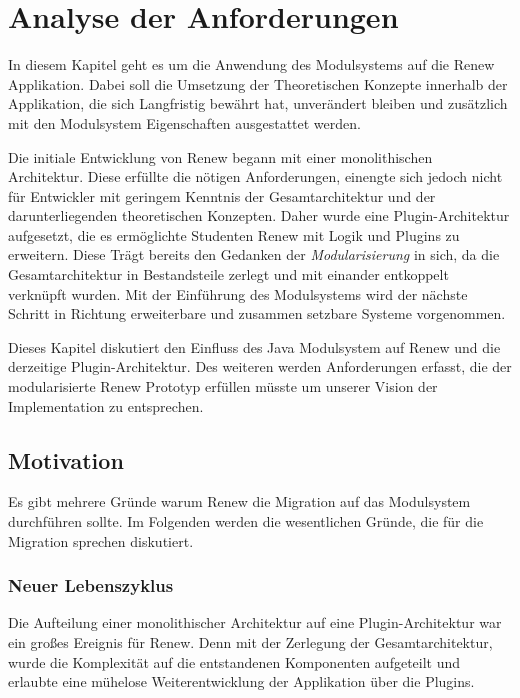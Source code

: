 \chapter{Analyse der Anforderungen}\label{cha:anforderungen}
In diesem Kapitel geht es um die Anwendung des Modulsystems auf die Renew Applikation. Dabei soll die Umsetzung der Theoretischen Konzepte innerhalb der Applikation, die sich Langfristig bewährt hat, unverändert bleiben und zusätzlich mit den Modulsystem Eigenschaften ausgestattet werden. \bigbreak


Die initiale Entwicklung von Renew begann mit einer monolithischen Architektur. Diese erfüllte die nötigen Anforderungen, einengte sich jedoch nicht für Entwickler mit geringem Kenntnis der Gesamtarchitektur und der darunterliegenden theoretischen Konzepten. Daher wurde eine Plugin-Architektur aufgesetzt, die es ermöglichte Studenten Renew mit Logik und Plugins zu erweitern. Diese Trägt bereits den Gedanken der \textit{Modularisierung} in sich, da die Gesamtarchitektur in Bestandsteile zerlegt und mit einander entkoppelt verknüpft wurden. Mit der Einführung des Modulsystems wird der nächste Schritt in Richtung erweiterbare und zusammen setzbare Systeme vorgenommen. \bigbreak


Dieses Kapitel diskutiert den Einfluss des Java Modulsystem auf Renew und die derzeitige Plugin-Architektur. Des weiteren werden Anforderungen erfasst, die der modularisierte Renew Prototyp erfüllen müsste um unserer Vision der Implementation zu entsprechen. 

\section{Motivation}\label{sec:motivation}
Es gibt mehrere Gründe warum Renew die Migration auf das Modulsystem durchführen sollte. Im Folgenden werden die wesentlichen Gründe, die für die Migration sprechen diskutiert.  

\subsection{ Neuer Lebenszyklus}\label{sub:_neuer_lebenszyklus}
Die Aufteilung einer monolithischer Architektur auf eine Plugin-Architektur war ein großes Ereignis für Renew. Denn mit der Zerlegung der Gesamtarchitektur, wurde die Komplexität auf die entstandenen Komponenten aufgeteilt und erlaubte eine mühelose Weiterentwicklung der Applikation über die Plugins. \bigbreak


